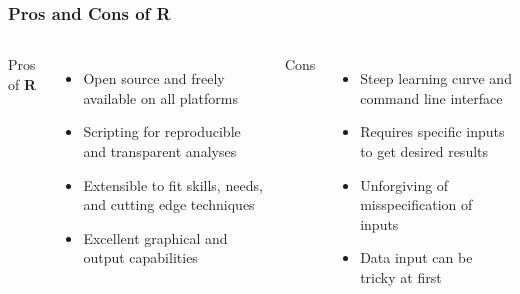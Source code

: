 \documentclass[12pt,handout]{beamer}
\begin{document}
\begin{frame}
\frametitle{Pros and Cons of R}
  \begin{columns}
  Pros of \textbf{R}
  \begin{itemize}
  \item Open source and freely available on all platforms
  \item Scripting for reproducible and transparent analyses
  \item Extensible to fit skills, needs, and cutting edge techniques
  \item Excellent graphical and output capabilities
  \end{itemize}
  Cons
  \begin{itemize}
  \item Steep learning curve and command line interface
  \item Requires specific inputs to get desired results
  \item Unforgiving of misspecification of inputs
  \item Data input can be tricky at first
  \end{itemize}
  \end{columns}
\end{frame}
\end{document}
